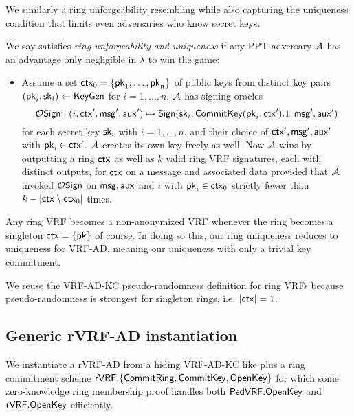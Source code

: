 We similarly a ring unforgeability resembling
 \cite[pp. 7 Def. 7]{cryptoeprint:2005:304} %
while also capturing the uniqueness condition that limits even adversaries who know secret keys.

\begin{definition}
We say \rVRF satisfies {\em ring unforgeability and uniqueness} if
any PPT adversary $\mathcal{A}$ has an advantage only
 negligible in $\lambda$ to win the game:
\begin{itemize}
\item[]
 Assume a set $\mathsf{ctx}_0 = \{ \mathsf{pk}_1,\ldots,\mathsf{pk}_n \}$ of public keys from
 distinct key pairs $(\mathsf{pk}_i,\mathsf{sk}_i) \leftarrow {\ensuremath{\mathsf{KeyGen}}}$ for $i=1,\ldots,n$.
 $\mathcal{A}$ has signing oracles
 $$ \mathcal{O}\mathsf{Sign} : (i,\mathsf{ctx}',\mathsf{msg}',\mathsf{aux}') \mapsto
  {\ensuremath{\mathsf{Sign}}}(\mathsf{sk}_i,{\mathsf{CommitKey}}(\mathsf{pk}_i,\mathsf{ctx}').1,\mathsf{msg}',\mathsf{aux}') $$
 for each secret key $\mathsf{sk}_i$ with $i=1,\ldots,n$, and
  their choice of $\mathsf{ctx}',\mathsf{msg}',\mathsf{aux}'$ with $\mathsf{pk}_i \in \mathsf{ctx}'$.
 $\mathcal{A}$ creates its own key freely as well.
 Now $\mathcal{A}$ wins by outputting a ring $\mathsf{ctx}$ as well as
 $k$ valid ring VRF signatures, each with distinct outputs,    %
 for $\mathsf{ctx}$ on a message \msg and associated data \aux
 provided that
 $\mathcal{A}$ invoked $\mathcal{O}\mathsf{Sign}$ on $\mathsf{msg},\mathsf{aux}$ and $i$ with $\mathsf{pk}_i \in \mathsf{ctx}_0$
  strictly fewer than $k - |\mathsf{ctx} \setminus \mathsf{ctx}_0|$ times.
\end{itemize}
\end{definition}

Any ring VRF becomes a non-anonymized VRF whenever
 the ring becomes a singleton $\mathsf{ctx} = \{ \mathsf{pk} \}$ of course.
In doing so this, our ring uniqueness reduces to uniqueness for VRF-AD,
meaning our uniqueness with only a trivial key commitment.

We reuse the VRF-AD-KC pseudo-randomness definition for ring VRFs
because pseudo-randomness is strongest for singleton rings, i.e. $|\mathsf{ctx}| = 1$.


\subsection{Generic rVRF-AD instantiation}

We instantiate a rVRF-AD from a hiding VRF-AD-KC like \PedVRF plus
a ring commitment scheme
 ${\mathsf{rVRF}}.\{ {\mathsf{CommitRing}}, {\mathsf{CommitKey}}, {\mathsf{OpenKey}} \}$
for which some zero-knowledge ring membership proof handles both
 ${\mathsf{PedVRF}}.{\mathsf{OpenKey}}$ and ${\mathsf{rVRF}}.{\mathsf{OpenKey}}$
efficiently.


